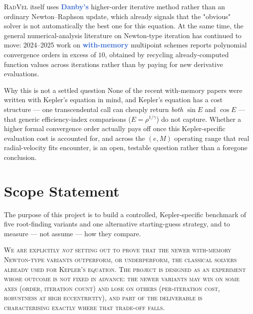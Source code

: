 \documentclass[11pt,a4paper]{article}
\newcommand{\key}[1]{\textcolor{Highlight}{\bfseries #1}}
\begin{document}
\textsc{RadVel} itself uses \key{Danby's} higher-order iterative method
rather than an ordinary Newton--Raphson update, which already signals that
the "obvious" solver is not automatically the best one for this equation.
At the same time, the general numerical-analysis literature on
Newton-type iteration has continued to move: 2024--2025 work on
\key{with-memory} multipoint schemes reports polynomial convergence orders
in excess of $10$, obtained by recycling already-computed function values
across iterations rather than by paying for new derivative evaluations.

\begin{notetitled}{Why this is not a settled question}
None of the recent with-memory papers were written with Kepler's equation
in mind, and Kepler's equation has a cost structure --- one transcendental
call can cheaply return \emph{both} $\sin E$ and $\cos E$ --- that generic
efficiency-index comparisons ($E=\rho^{1/\gamma}$) do not capture. Whether
a higher formal convergence order actually pays off once this
Kepler-specific evaluation cost is accounted for, and across the
$(e,M)$ operating range that real radial-velocity fits encounter, is an
open, testable question rather than a foregone conclusion.
\end{notetitled}

\section{Scope Statement}

The purpose of this project is to build a controlled, Kepler-specific
benchmark of five root-finding variants and one alternative starting-guess
strategy, and to measure --- not assume --- how they compare.

\begin{tcolorbox}[
  enhanced, colback=Paper, colframe=Accent, boxrule=0.9pt, arc=0pt,
  left=10pt,right=10pt,top=8pt,bottom=8pt, before skip=1em, after skip=1.2em
]
\scshape\color{Ink}\small We are explicitly \emph{not} setting out to prove
that the newer with-memory Newton-type variants outperform, or
underperform, the classical solvers already used for Kepler's equation.
\normalfont\upshape\color{Ink} The project is designed as an experiment
whose outcome is not fixed in advance: the newer variants may win on some
axes (order, iteration count) and lose on others (per-iteration cost,
robustness at high eccentricity), and part of the deliverable is
characterising exactly where that trade-off falls.
\end{tcolorbox}
\end{document}

